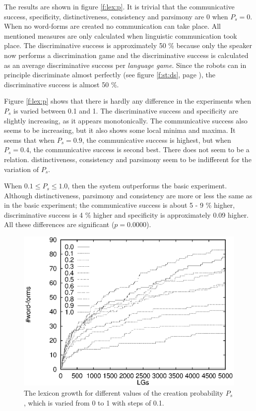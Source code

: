 The results are shown in figure \ref{f:lex:p}. It is trivial that the communicative success, specificity, distinctiveness, consistency and parsimony are 0 when $P_s=0$. When no word-forms are created no communication can take place. All mentioned measures are only calculated when linguistic communication took place. The discriminative success is approximately 50 \% because only the speaker now performs a discrimination game and the discriminative success is calculated as an average discriminative success per {\em language game}. Since the robots can in principle discriminate almost perfectly (see figure \ref{f:st:ds}, page \pageref{f:st:ds}), the discriminative success is almost 50 \%. 

Figure \ref{f:lex:p} shows that there is hardly any difference in the experiments when $P_s$ is varied between 0.1 and 1. The discriminative success and specificity are slightly increasing, as it appears monotonically. The communicative success also seems to be increasing, but it also shows some local minima and maxima. It seems that when $P_s=0.9$, the communicative success is highest, but when $P_s=0.4$, the communicative success is second best. There does not seem to be a relation. distinctiveness, consistency and parsimony seem to be indifferent for the variation of $P_s$.

When $0.1 \leq P_s \leq 1.0$, then the system outperforms the basic experiment. Although distinctiveness, parsimony and consistency are more or less the same as in the basic experiment; the communicative success is about 5 - 9 \% higher, discriminative success is 4 \% higher and specificity is approximately 0.09 higher. All these differences are significant ($p=0.0000$).

\begin{figure}[t]
\centerline{\includegraphics[width=12cm]{lexicon/words.eps}}
\caption{The lexicon growth for different values of the creation probability $P_s$, which is varied from 0 to 1 with steps of 0.1.}
\label{f:lex:words}
\end{figure}

